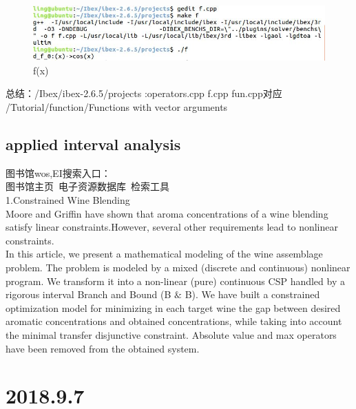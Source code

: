 \documentclass[UTF8]{ctexart}
\begin{document}
\begin{figure}
  \includegraphics[width=.8\linewidth]{make2.JPG}
  \caption{f(x)}
  \label{fig:boat1}
\end{figure}
总结：/Ibex/ibex-2.6.5/projects :operators.cpp f.cpp  fun.cpp对应\\
/Tutorial/function/Functions with vector arguments\\
\subsection{applied interval analysis }
图书馆wos,EI搜索入口：\\
图书馆主页~电子资源数据库~检索工具\\
1.Constrained Wine Blending\\
Moore and Griffin have shown that aroma concentrations of a wine blending satisfy linear constraints.However, several other requirements lead to nonlinear constraints.\\

In this article, we present a mathematical modeling of the wine assemblage
problem. The problem is modeled by a mixed (discrete and continuous) nonlinear
program. We transform it into a non-linear (pure) continuous CSP handled
by a rigorous interval Branch and Bound (B $\&$ B). We have built a constrained
optimization model for minimizing in each target wine the gap between desired
aromatic concentrations and obtained concentrations, while taking into account
the minimal transfer disjunctive constraint. Absolute value and max operators
have been removed from the obtained system.\\
\section{2018.9.7}
\end{document}
